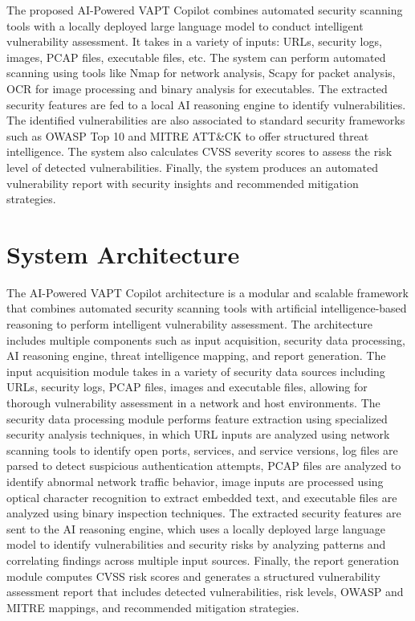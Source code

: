 \documentclass[runningheads]{llncs}
\begin{document}
The proposed AI-Powered VAPT Copilot combines automated security scanning tools with a locally deployed large language model to conduct intelligent vulnerability assessment. It takes in a variety of inputs: URLs, security logs, images, PCAP files, executable files, etc. The system can perform automated scanning using tools like Nmap for network analysis, Scapy for packet analysis, OCR for image processing and binary analysis for executables. The extracted security features are fed to a local AI reasoning engine to identify vulnerabilities. The identified vulnerabilities are also associated to standard security frameworks such as OWASP Top 10 and MITRE ATT\&CK to offer structured threat intelligence. The system also calculates CVSS severity scores to assess the risk level of detected vulnerabilities. Finally, the system produces an automated vulnerability report with security insights and recommended mitigation strategies.

\section{System Architecture}

The AI-Powered VAPT Copilot architecture is a modular and scalable framework that combines automated security scanning tools with artificial intelligence-based reasoning to perform intelligent vulnerability assessment. The architecture includes multiple components such as input acquisition, security data processing, AI reasoning engine, threat intelligence mapping, and report generation. The input acquisition module takes in a variety of security data sources including URLs, security logs, PCAP files, images and executable files, allowing for thorough vulnerability assessment in a network and host environments. The security data processing module performs feature extraction using specialized security analysis techniques, in which URL inputs are analyzed using network scanning tools to identify open ports, services, and service versions, log files are parsed to detect suspicious authentication attempts, PCAP files are analyzed to identify abnormal network traffic behavior, image inputs are processed using optical character recognition to extract embedded text, and executable files are analyzed using binary inspection techniques. The extracted security features are sent to the AI reasoning engine, which uses a locally deployed large language model to identify vulnerabilities and security risks by analyzing patterns and correlating findings across multiple input sources. Finally, the report generation module computes CVSS risk scores and generates a structured vulnerability assessment report that includes detected vulnerabilities, risk levels, OWASP and MITRE mappings, and recommended mitigation strategies.
\end{document}
